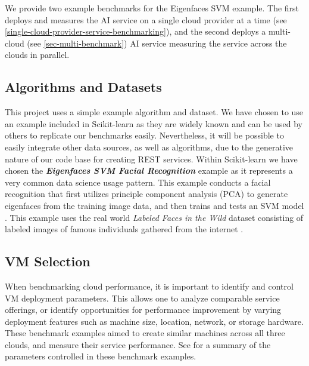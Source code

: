 We provide two example benchmarks for the Eigenfaces SVM example. The
first deploys and measures the AI service on a single cloud provider
at a time (see \ref{single-cloud-provider-service-benchmarking}), and
the second deploys a multi-cloud (see \ref{sec-multi-benchmark}) AI
service measuring the service across the clouds in parallel.


\subsection{Algorithms and Datasets}
\label{sec:algorithms-and-datasets}

This project uses a simple example algorithm and dataset. We have
chosen to use an example included in Scikit-learn as they are widely
known and can be used by others to replicate our benchmarks
easily. Nevertheless, it will be possible to easily integrate other
data sources, as well as algorithms, due to the generative nature of
our code base for creating REST services. Within Scikit-learn we have
chosen the {\bf\em Eigenfaces SVM Facial Recognition} example as it
represents a very common data science usage pattern. This example
conducts a facial recognition that first utilizes principle component
analysis (PCA) to generate eigenfaces from the training image data,
and then trains and tests an SVM
model \cite{www-skikit-learn-faces}. This example uses the real world
{\em Labeled Faces in the Wild} dataset consisting of labeled images
of famous individuals gathered from the internet \cite{faces-data}.




\subsection{VM Selection}\label{vm-selection}

When benchmarking cloud performance, it is important to identify and
control VM deployment parameters. This allows one to analyze
comparable service offerings, or identify opportunities for
performance improvement by varying deployment features such as machine
size, location, network, or storage hardware. These benchmark examples
aimed to create similar machines across all three clouds, and measure
their service performance. See  for a summary of the
parameters controlled in these benchmark examples.


